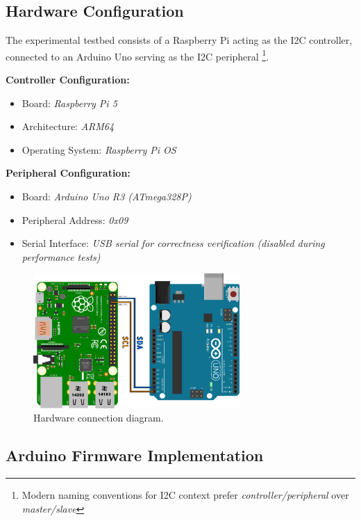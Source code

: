 \subsection{Hardware Configuration}
\label{subsec:hardware-config}

The experimental testbed consists of a Raspberry Pi acting as the I2C controller, connected to an Arduino Uno serving as the I2C peripheral \footnote{Modern naming conventions for I2C context prefer \textit{controller/peripheral} over \textit{master/slave}}.

\textbf{Controller Configuration:}
\begin{itemize}
    \item Board: \textit{Raspberry Pi 5}
    \item Architecture: \textit{ARM64} %
    \item Operating System: \textit{Raspberry Pi OS}
\end{itemize}

\textbf{Peripheral Configuration:}
\begin{itemize}
    \item Board: \textit{Arduino Uno R3 (ATmega328P)}
    \item Peripheral Address: \textit{0x09}
    \item Serial Interface: \textit{USB serial for correctness verification (disabled during performance tests)}
\end{itemize}

\begin{figure}[h]
	\centering
	\includegraphics[width=0.7\textwidth]{images/HW_config.png}
	\caption{Hardware connection diagram.}
	\label{fig:hw-connection}
\end{figure}

\subsection{Arduino Firmware Implementation}
\label{subsec:arduino-firmware}

